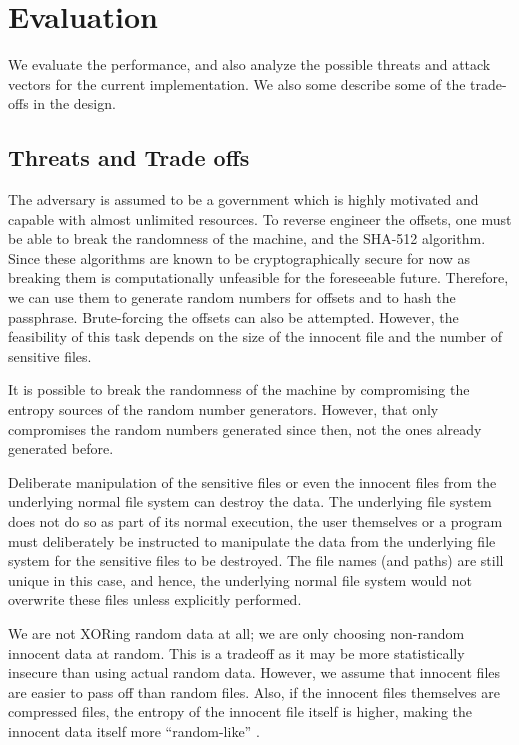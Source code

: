 \documentclass[10pt,twocolumn]{article}
\begin{document}
\section{Evaluation}

We evaluate the performance, and also analyze the possible threats and attack vectors for the current implementation. We also some describe some of the trade-offs in the design.

\subsection{Threats and Trade offs}

The adversary is assumed to be a government which is highly motivated and capable with almost unlimited resources. To reverse engineer the offsets, one must be able to break the randomness of the machine, and the SHA-512 algorithm. Since these algorithms are known to be cryptographically secure for now as breaking them is computationally unfeasible for the foreseeable future. Therefore, we can use them to generate random numbers for offsets and to hash the passphrase. Brute-forcing the offsets can also be attempted. However, the feasibility of this task depends on the size of the innocent file and the number of sensitive files.

It is possible to break the randomness of the machine by compromising the entropy sources of the random number generators. However, that only compromises the random numbers generated since then, not the ones already generated before.

Deliberate manipulation of the sensitive files or even the innocent files from the underlying normal file system can destroy the data. The underlying file system does not do so as part of its normal execution, the user themselves or a program must deliberately be instructed to manipulate the data from the underlying file system for the sensitive files to be destroyed. The file names (and paths) are still unique in this case, and hence, the underlying normal file system would not overwrite these files unless explicitly performed.

We are not XORing random data at all; we are only choosing non-random innocent data at random. This is a tradeoff as it may be more statistically insecure than using actual random data. However, we assume that innocent files are easier to pass off than random files. Also, if the innocent files themselves are compressed files, the entropy of the innocent file itself is higher, making the innocent data itself more ``random-like'' \cite{compression}.
\end{document}
